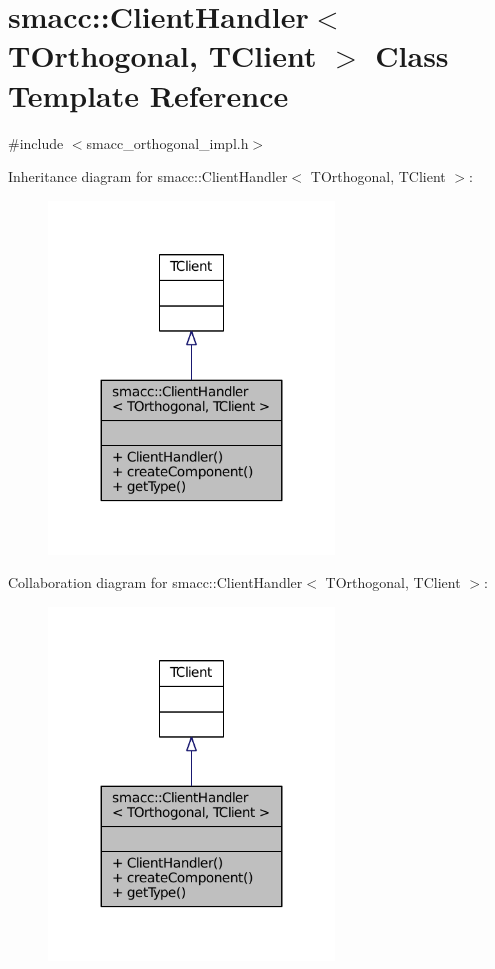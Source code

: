 \hypertarget{classsmacc_1_1ClientHandler}{}\section{smacc\+:\+:Client\+Handler$<$ T\+Orthogonal, T\+Client $>$ Class Template Reference}
\label{classsmacc_1_1ClientHandler}


{\ttfamily \#include $<$smacc\+\_\+orthogonal\+\_\+impl.\+h$>$}



Inheritance diagram for smacc\+:\+:Client\+Handler$<$ T\+Orthogonal, T\+Client $>$\+:
\nopagebreak
\begin{figure}[H]
\begin{center}
\leavevmode
\includegraphics[width=215pt]{classsmacc_1_1ClientHandler__inherit__graph}
\end{center}
\end{figure}


Collaboration diagram for smacc\+:\+:Client\+Handler$<$ T\+Orthogonal, T\+Client $>$\+:
\nopagebreak
\begin{figure}[H]
\begin{center}
\leavevmode
\includegraphics[width=215pt]{classsmacc_1_1ClientHandler__coll__graph}
\end{center}
\end{figure}
